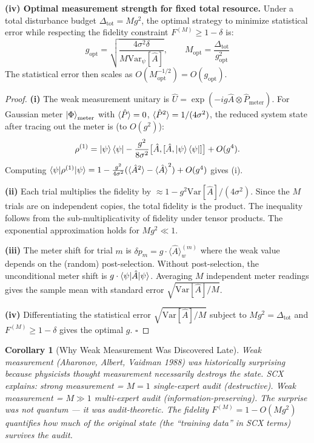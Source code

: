 \documentclass[11pt,a4paper]{article}
\newtheorem{corollary}[theorem]{Corollary}
\theoremstyle{definition}
\theoremstyle{remark}
\newcommand{\brak}[1]{\langle #1 \rangle}
\newcommand{\Var}{\mathrm{Var}}
\begin{document}
\noindent\textbf{(iv) Optimal measurement strength for fixed total resource.}
Under a total disturbance budget $\Delta_{\text{tot}} = M g^2$, the optimal strategy to minimize statistical error while respecting the fidelity constraint $F^{(M)} \geq 1 - \delta$ is:
\[
g_{\text{opt}} = \sqrt{\frac{4\sigma^2 \delta}{M \Var_{\psi}[\hat{A}]}}, \qquad M_{\text{opt}} = \frac{\Delta_{\text{tot}}}{g_{\text{opt}}^2}
\]
The statistical error then scales as $O(M_{\text{opt}}^{-1/2}) = O(g_{\text{opt}})$.

\begin{proof}
\textbf{(i)} The weak measurement unitary is $\hat{U} = \exp(-i g \hat{A} \otimes \hat{P}_{\text{meter}})$. For Gaussian meter $\ket{\Phi}_{\text{meter}}$ with $\braket{\hat{P}} = 0$, $\braket{\hat{P}^2} = 1/(4\sigma^2)$, the reduced system state after tracing out the meter is (to $O(g^2)$):
\[
\rho^{(1)} = \ket{\psi}\bra{\psi} - \frac{g^2}{8\sigma^2}\bigl[\hat{A}, [\hat{A}, \ket{\psi}\bra{\psi}]\bigr] + O(g^4).
\]
Computing $\braket{\psi|\rho^{(1)}|\psi} = 1 - \frac{g^2}{4\sigma^2}(\braket{\hat{A}^2} - \braket{\hat{A}}^2) + O(g^4)$ gives (i).

\textbf{(ii)} Each trial multiplies the fidelity by $\approx 1 - g^2 \Var[\hat{A}]/(4\sigma^2)$. Since the $M$ trials are on independent copies, the total fidelity is the product. The inequality follows from the sub-multiplicativity of fidelity under tensor products. The exponential approximation holds for $M g^2 \ll 1$.

\textbf{(iii)} The meter shift for trial $m$ is $\delta p_m = g \cdot \brak{\hat{A}}_w^{(m)}$ where the weak value depends on the (random) post-selection. Without post-selection, the unconditional meter shift is $g \cdot \braket{\psi|\hat{A}|\psi}$. Averaging $M$ independent meter readings gives the sample mean with standard error $\sqrt{\Var[\hat{A}]/M}$.

\textbf{(iv)} Differentiating the statistical error $\sqrt{\Var[\hat{A}]/M}$ subject to $M g^2 = \Delta_{\text{tot}}$ and $F^{(M)} \geq 1 - \delta$ gives the optimal $g$. $\square$
\end{proof}

\begin{corollary}[Why Weak Measurement Was Discovered Late]
Weak measurement (Aharonov, Albert, Vaidman 1988) was historically surprising because physicists thought measurement necessarily destroys the state. SCX explains: strong measurement = $M=1$ single-expert audit (destructive). Weak measurement = $M \gg 1$ multi-expert audit (information-preserving). The surprise was not quantum --- it was audit-theoretic. The fidelity $F^{(M)} = 1 - O(M g^2)$ quantifies \emph{how much of the original state (the ``training data'' in SCX terms) survives the audit}.
\end{corollary}
\end{document}
